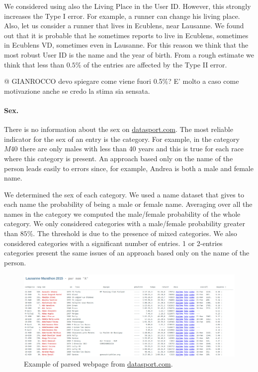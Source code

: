 \documentclass[fleqn,10pt]{wlscirep}
\begin{document}
        We considered using also the Living Place in the User ID. However, this strongly increases
        the Type I error. For example, a runner can change his living place. Also, let us consider
        a runner that lives in Ecublens, near Lausanne. We found out that it is probable that he sometimes
        reports to live in Ecublens, sometimes in Ecublens VD, sometimes even in Lausanne.
        For this reason we think that the most robust User ID is the name and the year of birth.
        From a rough estimate we think that less than $0.5\%$ of the entries are affected by the Type II error.

        @ GIANROCCO devo spiegare come viene fuori 0.5\%? E' molto a caso come motivazione anche se credo la
        stima sia sensata.

        \paragraph{Sex.} There is no information about the sex on \url{datasport.com}.
        The most reliable indicator for the sex of an entry is the category. For example, in 
        the category $M40$ there are only males with less than 40 years and this is true for
        each race where this category is present.
        An approach based only on the name of the person leads easily to errors since, for example,
        Andrea is both a male and female name.

        We determined the sex of each category. We used a name dataset that gives to
        each name the probability of being a male or female name.
        Averaging over all the names in the category we computed the male/female
        probability of the whole category. We only considered categories with a 
        male/female probability greater than $85\%$. The threshold is due to the presence
        of mixed categories.
        We also considered categories with a significant number of entries. 1 or 2-entries categories
        present the same issues of an approach based only on the name of the person.

\begin{figure}[h!]
    \centering
    \includegraphics[scale=0.32]{Figures/exampleParsing.png}
    \caption{Example of parsed webpage from \url{datasport.com}.}
    \label{fig:exParsing}
\end{figure}
\end{document}
